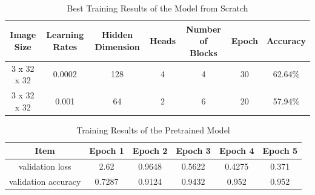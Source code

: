 \documentclass{article} %
\begin{document}
\begin{table}[ht]
  \centering
    \begin{tabular}{ c | c | c | c | c  | c | c }
      \hline
      Image Size & Learning Rates & Hidden Dimension & Heads & Number of Blocks & Epoch & Accuracy \\ \hline
      3 x 32 x 32 & 0.0002 & 128 & 4 & 4 & 30 & 62.64\% \\ \hline
      3 x 32 x 32 & 0.001 & 64 & 2 & 6 & 20 & 57.94\% \\ \hline
    \end{tabular}
    \caption{Best Training Results of the Model from Scratch}
  \label{tab:my_label}
\end{table}


\begin{table}[ht]
  \centering
    \begin{tabular}{ c | c | c | c | c  | c }
      \hline
      Item & Epoch 1 & Epoch 2 & Epoch 3 & Epoch 4 & Epoch 5 \\ \hline
      validation loss & 2.62 & 0.9648 & 0.5622 & 0.4275 & 0.371\\ \hline
      validation accuracy & 0.7287  & 0.9124 & 0.9432 & 0.952 & 0.952 \\ \hline
    \end{tabular}
    \caption{Training Results of the Pretrained Model}
  \label{tab:my_label}
\end{table}
\end{document}
